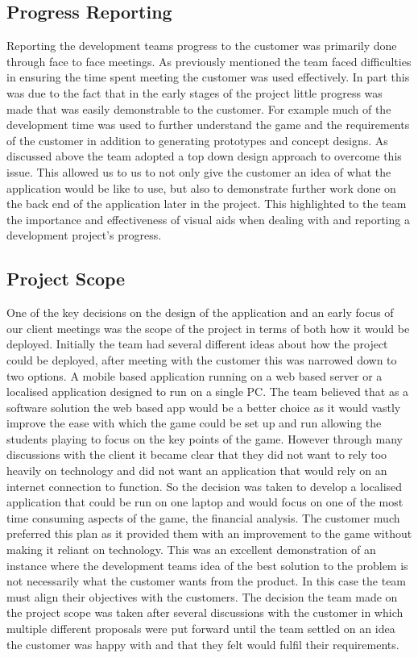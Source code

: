 \documentclass{l3proj}
\begin{document}
\subsection{Progress Reporting}
Reporting the development teams progress to the customer was primarily done through face to face meetings. As previously mentioned the team faced difficulties in ensuring the time spent meeting the customer was used effectively. In part this was due to the fact that in the early stages of the project little progress was made that was easily demonstrable to the customer. For example much of the development time was used to further understand the game and the requirements of the customer in addition to generating prototypes and concept designs. As discussed above the team adopted a top down design approach to overcome this issue. This allowed us to us to not only give the customer an idea of what the application would be like to use, but also to demonstrate further work done on the back end of the application later in the project. This highlighted to the team the importance and effectiveness of visual aids when dealing with and reporting a development project’s progress.

\subsection{Project Scope}
One of the key decisions on the design of the application and an early focus of our client meetings was the scope of the project in terms of both how it would be deployed. Initially the team had several different ideas about how the project could be deployed, after meeting with the customer this was narrowed down to two options. A mobile based application running on a web based server or a localised application designed to run on a single PC. The team believed that as a software solution the web based app would be a better choice as it would vastly improve the ease with which the game could be set up and run allowing the students playing to focus on the key points of the game. However through many discussions with the client it became clear that they did not want to rely too heavily on technology and did not want an application that would rely on an internet connection to function. So the decision was taken to develop a localised application that could be run on one laptop and would focus on one of the most time consuming aspects of the game, the financial analysis. The customer much preferred this plan as it provided them with an improvement to the game without making it reliant on technology. This was an excellent demonstration of an instance where the development teams idea of the best solution to the problem is not necessarily what the customer wants from the product. In this case the team must align their objectives with the customers. The decision the team made on the project scope was taken after several discussions with the customer in which multiple different proposals were put forward until the team settled on an idea the customer was happy with and that they felt would fulfil their requirements.
\end{document}
